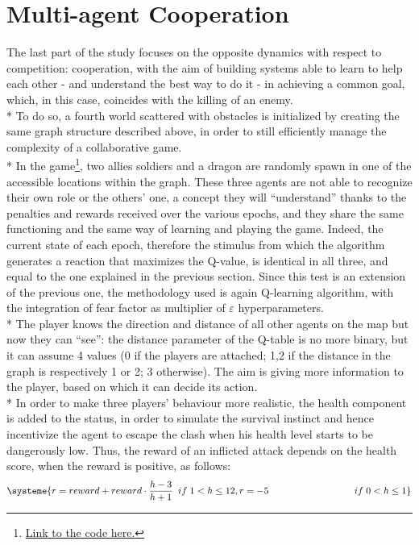 \section{Multi-agent Cooperation}
The last part of the study focuses on the opposite dynamics with respect to competition: cooperation, with the aim of building systems able to learn to help each other - and understand the best way to do it - in achieving a common goal, which, in this case, coincides with the killing of an enemy.\\*
To do so, a fourth world scattered with obstacles is initialized by creating the same graph structure described above, in order to still efficiently manage the complexity of a collaborative game.\\*
In the game\footnote{\href{https://github.com/moiraghif/DragonHunting/tree/master/TeamWork}{Link to the code here.}}, two allies soldiers and a dragon are randomly spawn in one of the accessible locations within the graph. 
These three agents are not able to recognize their own role or the others' one, a concept they will ``understand'' thanks to the penalties and rewards received over the various epochs, and they share the same functioning and the same way of learning and playing the game. 
Indeed, the current state of each epoch, therefore the stimulus from which the algorithm generates a reaction that maximizes the Q-value, is identical in all three, and equal to the one explained in the previous section. Since this test is an extension of the previous one, the methodology used is again Q-learning algorithm, with the integration of fear factor as multiplier of $\varepsilon$ hyperparameters. \\*
The player knows the direction and distance of all other agents on the map but now they can ``see'': the distance parameter of the Q-table is no more binary, but it can assume 4 values (0 if the players are attached; 1,2 if the distance in the graph is respectively 1 or 2; 3 otherwise). The aim is giving more information to the player, based on which it can decide its action.\\*
In order to make three players' behaviour more realistic, the health component is added to the status, in order to simulate the survival instinct and hence incentivize the agent to escape the clash when his health level starts to be dangerously low. Thus, the reward of an inflicted attack depends on the health score, when the reward is positive, as follows:
\[
\systeme{r = reward+reward\cdot\frac{h-3}{h+1}\;\;if\;1<h\leq 12, r = -5\qquad\qquad\qquad\qquad\quad if\;0<h\leq 1}
\]
